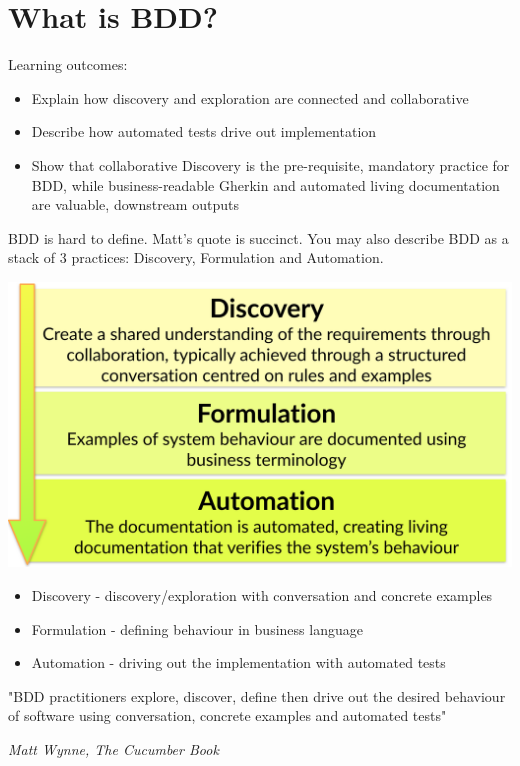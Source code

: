 \chapter*{What is BDD?}

\ifnotes

    Learning outcomes:
    
    \begin{itemize}
        \item Explain how discovery and exploration are connected and collaborative 
        \item Describe how automated tests drive out implementation
        \item Show that collaborative Discovery is the pre-requisite, mandatory practice for BDD, while business-readable Gherkin and automated living documentation are valuable, downstream outputs
    \end{itemize}
    
    BDD is hard to define. Matt's quote is succinct. You may also describe BDD as a stack of 3 practices: Discovery, Formulation and Automation. 
    
    \includegraphics[width=\textwidth]{images/three-practices}


    \begin{itemize}
        \item Discovery - discovery/exploration with conversation and concrete examples
        \item Formulation - defining behaviour in business language
        \item Automation - driving out the implementation with automated tests
    \end{itemize}
\fi

\ifcontent

    \begin{framed}
        "BDD practitioners explore, discover, define then drive out the desired behaviour of software using conversation, concrete examples and automated tests"
        \begin{flushright}
            \textit{Matt Wynne, The Cucumber Book}
        \end{flushright}
    \end{framed}
    
